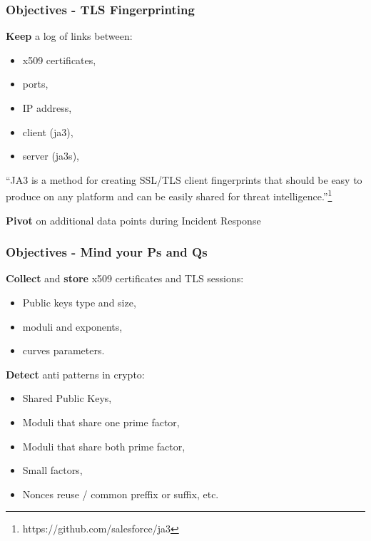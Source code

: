 \documentclass{beamer}
\begin{document}
\begin{frame}
  \frametitle{Objectives - TLS Fingerprinting}
        {\bf Keep} a log of links between:
        \begin{itemize}
          \item x509 certificates,
          \item ports,
          \item IP address,
          \item client (ja3),
          \item server (ja3s),
        \end{itemize}
        \begin{displayquote}
        ``JA3 is a method for creating SSL/TLS client fingerprints that should be easy to produce on any platform and can be easily shared for threat intelligence.''\footnote{https://github.com/salesforce/ja3}
        \end{displayquote}

         {\bf Pivot} on additional data points during Incident Response 
\end{frame}

\begin{frame}
   \frametitle{Objectives - Mind your Ps and Qs}
   {\bf Collect} and {\bf store} x509 certificates and TLS sessions:
        \begin{itemize}
        \item Public keys type and size,
        \item moduli and exponents,
        \item curves parameters.
        \end{itemize}
        {\bf Detect} anti patterns in crypto:
        \begin{itemize}
          \item Shared Public Keys,
          \item Moduli that share one prime factor,
          \item Moduli that share both prime factor,
          \item Small factors,
          \item Nonces reuse / common preffix or suffix, etc. 
        \end{itemize}
        
\end{frame}
\end{document}
